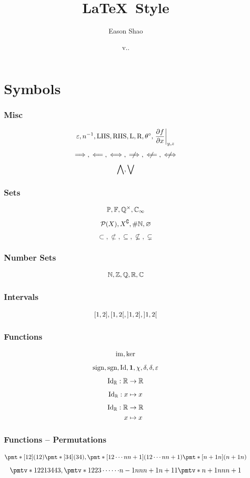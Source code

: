 \documentclass{beamer}
\title{\LaTeX\ Style}
\author[Y. Shao]{Eason Shao}
\date{v.\DATE.\COMMITSHA}
\begin{document}
\frame{
    \titlepage}


\section{Symbols}

\begin{frame}
    \frametitle{Misc}
    \[
        \varepsilon, n^{-1}, \text{LHS}, \text{RHS}, \text{L}, \text{R}, \theta^{\circ}, \left.\pdv{f}{x}\right\rvert_{y, z}
    \]
    \[
        \implies, \impliedby, \iff, \notimplies, \notimpliedby, \notiff
    \]
    \[
        \bigwedge, \bigvee
    \]
\end{frame}


\begin{frame}
    \frametitle{Sets}
    \[
        \mathbb{P}, \mathbb{F}, \mathbb{Q}^{\times}, \mathbb{C}_{\infty}
    \]
    \[
        \powerset\pqty{X}, X\compl, \size\NN, \emptyset
    \]
    \[
        \subset, \nsubset, \subseteq, \nsubseteq, \subsetneq
    \]

\end{frame}

\begin{frame}
    \frametitle{Number Sets}
    \[
        \mathbb{N}, \mathbb{Z}, \mathbb{Q}, \mathbb{R}, \mathbb{C}
    \]
\end{frame}

\begin{frame}
    \frametitle{Intervals}
    \[
        \ccintv{1}{2}, \cointv{1}{2}, \ocintv{1}{2}, \oointv{1}{2}
    \]
\end{frame}

\begin{frame}
    \frametitle{Functions}
    \[
        \operatorname{im}, \ker
    \]
    \[
        \operatorname{sign}, \operatorname{sgn}, \operatorname{Id}, \mathbf{1}, \chi, \delta, \delta, \varepsilon
    \]
    \[
        \operatorname{Id}_{\mathbb{R}}: \mathbb{R} \to \mathbb{R}
    \]
    \[
        \operatorname{Id}_{\mathbb{R}}: x \mapsto x
    \]
    \[
        \begin{aligned} \operatorname{Id}_{\mathbb{R}}: \mathbb{R} &\to \mathbb{R} \\ x &\mapsto x \end{aligned}
    \]
\end{frame}

\begin{frame}
    \frametitle{Functions -- Permutations}
    \[
    \perm{12} \perm{34}, \perm{{1}{2}\cdots{n}{n + 1}} \perm{{n + 1}n}
    \]
    \[
        \permverb{1234}{1{2} 2{1} 3{4} 4{3}}, \permverb{12{\cdots}{n - 1}{n}{n + 1}}{1{2} 2{3} \cdots{\cdots} {n - 1}{n} {n}{n + 1} {n + 1}{1}} \permverb{{n}{n + 1}}{{n + 1}{n} {n}{n + 1}}
    \]
\end{frame}
\end{document}
